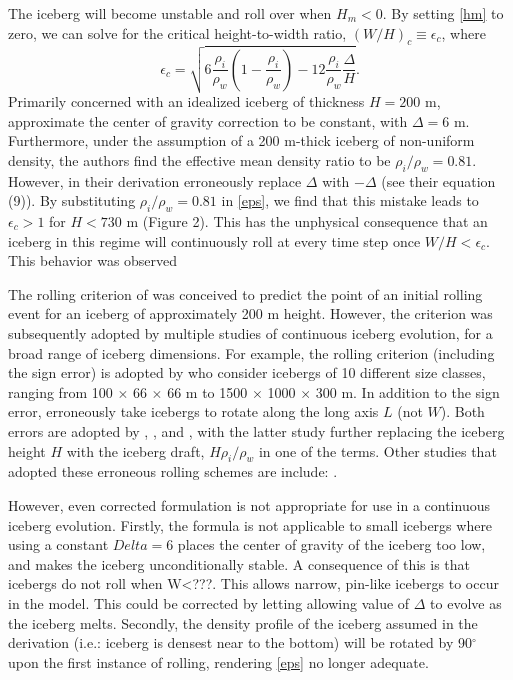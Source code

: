 \documentclass[twocol]{ametsoc_tw}
\newcommand{\be}[0]{\begin{equation}}
\newcommand{\ee}[0]{\end{equation}}
\newcommand{\ri}{\rho_i}
\newcommand{\rw}{\rho_w}
\begin{document}
The iceberg will become unstable and roll over when $H_m < 0$. By setting \eqref{hm} to zero, we can solve for the critical height-to-width ratio, $\left(W/H\right)_c \equiv \epsilon_c $, where
\be
\epsilon_c = \sqrt{6 \frac{\ri}{\rw}\left(1-\frac{\ri}{\rw}\right) -12\frac{\ri}{\rw} \frac{\Delta}{H}}. \label{eps}
\ee
Primarily concerned with an idealized iceberg of thickness $H = 200$ m, \cite{Weeks:1978vi} approximate the center of gravity correction to be constant, with $\Delta = 6$ m. Furthermore, under the assumption of a 200 m-thick iceberg of non-uniform density, the authors find the effective mean density ratio to be $\ri/\rw = 0.81$. However, in their derivation \cite{Weeks:1978vi} erroneously replace $\Delta$ with $-\Delta$  (see their equation (9)). By substituting $\ri/\rw = 0.81$ in \eqref{eps}, we find that this mistake leads to $\epsilon_c > 1$ for $H<730$ m (Figure 2). This has the unphysical consequence that an iceberg in this regime will continuously roll at every time step once $W/H < \epsilon_c$. This behavior was observed

The rolling criterion of \cite{Weeks:1978vi} was conceived to predict the point of an initial rolling event for an iceberg of approximately 200 m height. However, the criterion was subsequently adopted by multiple studies of continuous iceberg evolution, for a broad range of iceberg dimensions. For example, the rolling criterion (including the sign error) is adopted by \cite{Bigg:1997bp} who consider icebergs of 10 different size classes, ranging from 100 $\times$ 66 $\times$ 66 m to 1500 $\times$ 1000 $\times$ 300 m. In addition to the sign error, \cite{Bigg:1997bp} erroneously take icebergs to rotate along the long axis $L$ (not $W$). Both errors are adopted by \cite{Gladstone:2001cq}, \cite{Jongma:2009cl}, and \cite{Martin:2010kb}, with the latter study further replacing the iceberg height $H$ with the iceberg draft, $H \ri/\rw$ in one of the terms. Other studies that adopted these erroneous rolling schemes are \cite{Bigg:1997bp} include: \cite{Death:2006do,Jongma:2013hz,Death:2014cv,Roberts:2014ff,vandenBerk:2014cd,Bugelmayer:2015td,Merino:2016jm}.

However, even corrected  \cite{Weeks:1978vi} formulation is not appropriate for use in a continuous iceberg evolution. Firstly, the formula is not applicable to small icebergs where using a constant $Delta=6$ places the center of gravity of the iceberg too low, and makes the iceberg unconditionally stable. A consequence of this is that icebergs do not roll when W<???. This allows narrow, pin-like icebergs to occur in the model. This could be corrected by letting allowing value of $\Delta$ to evolve as the iceberg melts. Secondly, the density profile of the iceberg assumed in the  \cite{Weeks:1978vi} derivation (i.e.: iceberg is densest near to the bottom) will be rotated by 90$^\circ$ upon the first instance of rolling, rendering \eqref{eps} no longer adequate. 
\end{document}
